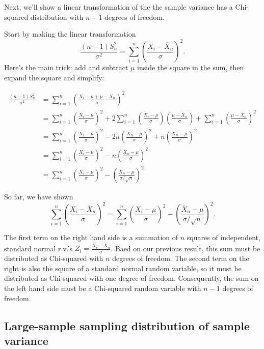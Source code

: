 \documentclass[]{book}
\begin{document}
Next, we'll show a linear transformation of the the sample variance has
a Chi-squared distribution with \(n-1\) degrees of freedom.

Start by making the linear transformation
\[\frac{(n-1)S_n^2}{\sigma^2} = \sum_{i=1}^n \left(\frac{X_i - \overline X_n}{\sigma}\right)^2.\]
Here's the main trick: add and subtract \(\mu\) inside the square in the
sum, then expand the square and simplify:

\begin{align*}
\frac{(n-1)S_n^2}{\sigma^2} &= \sum_{i=1}^n \left(\frac{X_i - \mu + \mu - \overline X_n}{\sigma}\right)^2\\
& = \sum_{i=1}^n \left(\frac{X_i - \mu}{\sigma}\right)^2 + 2\sum_{i=1}^n \left(\frac{X_i - \mu}{\sigma}\right)\left(\frac{\mu - \overline X_n}{\sigma}\right) + \sum_{i=1}^n \left(\frac{\mu - \overline X_n}{\sigma}\right)^2\\
& = \sum_{i=1}^n \left(\frac{X_i - \mu}{\sigma}\right)^2 - 2n\left(\frac{\overline X_n - \mu}{\sigma}\right)^2 + n\left(\frac{\overline X_n - \mu}{\sigma}\right)^2\\
& = \sum_{i=1}^n \left(\frac{X_i - \mu}{\sigma}\right)^2 - n\left(\frac{\overline X_n - \mu}{\sigma}\right)^2\\
& = \sum_{i=1}^n \left(\frac{X_i - \mu}{\sigma}\right)^2 - \left(\frac{\overline X_n - \mu}{\sigma/\sqrt{n}}\right)^2
\end{align*}

So far, we have shown
\[\sum_{i=1}^n \left(\frac{X_i - \overline X_n}{\sigma}\right)^2 = \sum_{i=1}^n \left(\frac{X_i - \mu}{\sigma}\right)^2 - \left(\frac{\overline X_n - \mu}{\sigma/\sqrt{n}}\right)^2.\]

The first term on the right hand side is a summation of \(n\) squares of
independent, standard normal r.v.'s
\(Z_i = \frac{X_i - \overline X_n}{\sigma}\). Baed on our previous
result, this sum must be distributed as Chi-squared with \(n\) degrees
of freedom. The second term on the right is also the square of a
standard normal random variable, so it must be distributed as
Chi-squared with one degree of freedom. Consequently, the sum on the
left hand side must be a Chi-squared random variable with \(n-1\)
degrees of freedom.

\subsection{Large-sample sampling distribution of sample
variance}\label{large-sample-sampling-distribution-of-sample-variance}
\end{document}
